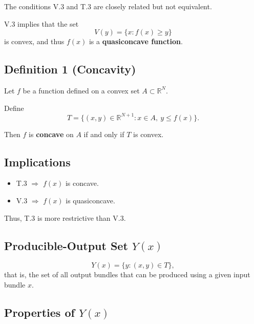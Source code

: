 The conditions V.3 and T.3 are closely related but not equivalent.

\medskip

V.3 implies that the set
\[
V(y)=\{x : f(x) \ge y\}
\]
is convex, and thus $f(x)$ is a \textbf{quasiconcave function}.

\medskip

\subsection*{Definition 1 (Concavity)}

Let $f$ be a function defined on a convex set $A \subset \mathbb{R}^N$.

Define
\[
T = \{(x,y) \in \mathbb{R}^{N+1} : x \in A,\ y \le f(x)\}.
\]

Then $f$ is \textbf{concave} on $A$ if and only if $T$ is convex.

\medskip

\subsection*{Implications}

\begin{itemize}
    \item T.3 $\Rightarrow$ $f(x)$ is concave.
    \item V.3 $\Rightarrow$ $f(x)$ is quasiconcave.
\end{itemize}

Thus, T.3 is more restrictive than V.3.



\subsection{Producible-Output Set $Y(x)$}

\[
Y(x)=\{y : (x,y)\in T\},
\]
that is, the set of all output bundles that can be produced using
a given input bundle $x$.

\subsection*{Properties of $Y(x)$}

